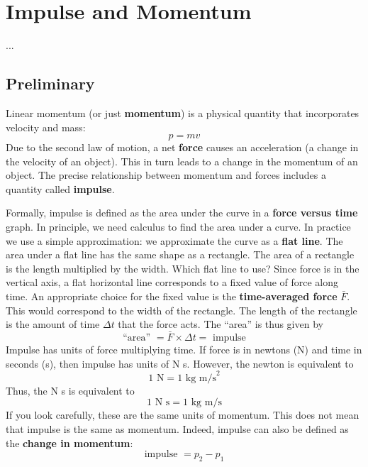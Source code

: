 \setcounter{chapter}{8}
\chapter{Impulse and Momentum}
...
\section{Preliminary}
Linear momentum (or just \textbf{momentum}) is a physical quantity that incorporates velocity and mass:
\begin{equation}
    p = m v
\end{equation}
Due to the second law of motion, a net \textbf{force} causes an acceleration (a change in the velocity of an object). This in turn leads to a change in the momentum of an object. The precise relationship between momentum and forces includes a quantity called \textbf{impulse}.

Formally, impulse is defined as the area under the curve in a \textbf{force versus time} graph. In principle, we need calculus to find the area under a curve. In practice we use a simple approximation: we approximate the curve as a \textbf{flat line}. The area under a flat line has the same shape as a rectangle. The area of a rectangle is the length multiplied by the width. Which flat line to use? Since force is in the vertical axis, a flat horizontal line corresponds to a fixed value of force along time. An appropriate choice for the fixed value is the \textbf{time-averaged force} $\bar{F}$. This would correspond to the width of the rectangle. The length of the rectangle is the amount of time $\Delta t$ that the force acts. The ``area'' is thus given by
\begin{equation}
    \text{``area'' } = \bar{F} \times \Delta t = \text{ impulse}
\end{equation}
Impulse has units of force multiplying time. If force is in newtons (N) and time in seconds (s), then impulse has units of N s. However, the newton is equivalent to
\begin{equation}
    1 \text{ N} = 1 \text{ kg m/s}^{2}
\end{equation}
Thus, the N s is equivalent to
\begin{equation}
    1 \text{ N s} = 1 \text{ kg m/s}
\end{equation}
If you look carefully, these are the same units of momentum. This does not mean that impulse is the same as momentum. Indeed, impulse can also be defined as the \textbf{change in momentum}:
\begin{equation}
    \text{impulse } = p_{2} - p_{1}
\end{equation}

